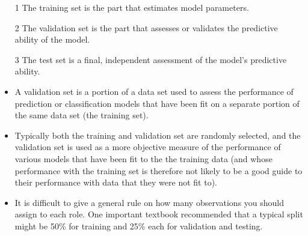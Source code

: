 \documentclass[a4paper,12pt]{article}
\begin{document}
\begin{framed}
\begin{itemize}
\item[1] The training set is the part that estimates model parameters.
\item[2] The validation set is the part that assesses or validates the predictive ability of the model.
\item[3] The test set is a final, independent assessment of the model's predictive ability.
\end{itemize}
\end{framed}
\begin{itemize}
	\item A validation set is a portion of a data set used to assess the performance of prediction or classification models that have been fit on a separate portion of the same data set (the training set). 
	\item Typically both the training and validation set are randomly selected, and the validation set is used as a more objective measure of the performance of various models that have been fit to the the training data (and whose performance with the training set is therefore not
	likely to be a good guide to their performance with data that they were not fit to).
	
\item It is difficult to give a general rule on how many observations you should assign to each role. One important textbook recommended that a typical split might be 50\% for training and 25\% each for validation and testing.
	 
\end{itemize}
\end{document}

